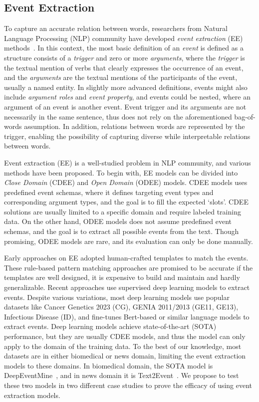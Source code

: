 \subsection{Event Extraction}\label{sec:ee}
To capture an accurate relation between words, researchers from Natural Language Processing (NLP) community have developed \textit{event extraction} (EE) methods~\cite{EESurveyBiomed}.
In this context, the most basic definition of an \textit{event} is defined as a structure consists of a \textit{trigger} and zero or more \textit{arguments},
where the \textit{trigger} is the textual mention of verbs that clearly expresses the occurrence of an event,
and the \textit{arguments} are the textual mentions of the participants of the event, usually a named entity.
In slightly more advanced definitions, events might also include \textit{argument roles} and \textit{event property}, and events could be nested, where an argument of an event is another event.
Event trigger and its arguments are not necessarily in the same sentence, thus does not rely on the aforementioned bag-of-words assumption.
In addition, relations between words are represented by the trigger, enabling the possibility of capturing diverse while interpretable relations between words.

Event extraction (EE) is a well-studied problem in NLP community, and various methods have been proposed.
To begin with, EE models can be divided into \textit{Close Domain} (CDEE) and \textit{Open Domain} (ODEE) models.
CDEE models uses predefined event schemas, where it defines targeting event types and corresponding argument types, and the goal is to fill the expected `slots'.
CDEE solutions are usually limited to a specific domain and require labeled training data.
On the other hand, ODEE models does not assume predefined event schemas, and the goal is to extract all possible events from the text.
Though promising, ODEE models are rare, and its evaluation can only be done manually.

Early approaches on EE adopted human-crafted templates to match the events.
These rule-based pattern matching approaches are promised to be accurate if the templates are well designed, it is expensive to build and maintain and hardly generalizable.
Recent approaches use supervised deep learning models to extract events.
Despite various variations, most deep learning models use popular datasets like Cancer Genetics 2023 (CG), GENIA 2011/2013 (GE11, GE13), Infectious Disease (ID),
and fine-tunes Bert-based or similar language models to extract events.
Deep learning models achieve state-of-the-art (SOTA) performance, but they are usually CDEE models, and thus the model can only apply to the domain of the training data.
To the best of our knowledge, most datasets are in either biomedical or news domain, limiting the event extraction models to these domains.
In biomedical domain, the SOTA model is DeepEventMine~\cite{trieu2020deepeventmine}, and in news domain it is Text2Event~\cite{lu2021text2event}.
We propose to test these two models in two different case studies to prove the efficacy of using event extraction models.

